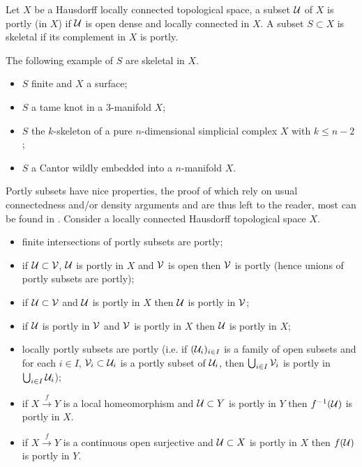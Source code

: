 \begin{defi} Let $X$ be a Hausdorff locally connected topological space, a subset $\mathcal{U}$ of $X$ is portly (in $X$) if $\mathcal{U}$ is open dense and locally connected in $X$. A subset $S\subset X$ is skeletal if its complement in $X$ is portly.
\end{defi}

\begin{ex} The following example of $S$ are skeletal in $X$.
\begin{itemize}
 \item $S$ finite  and $X$ a surface;
 \item $S$ a tame knot  in a $3$-manifold $X$;
 \item $S$ the $k$-skeleton of a pure $n$-dimensional simplicial complex $X$ with $k\leq n-2$;
 \item $S$ a Cantor wildly embedded into a $n$-manifold $X$.
\end{itemize} 
 \end{ex}





Portly subsets have nice properties, the proof of which rely on usual connectedness and/or density arguments and are thus left to the reader,
most can be found in \cite{MR0123298,MR1152367,MR2599123,thesis}. Consider a locally connected Hausdorff topological space $X$.
\begin{itemize}
 \item finite intersections of portly subsets are portly;
 \item if $\mathcal{U}\subset \mathcal V$, $\mathcal{U}$ is portly in $X$ and $\mathcal V$ is open then $\mathcal V$ is portly (hence unions of portly subsets are portly);
 \item if $\mathcal{U}\subset \mathcal V$ and $\mathcal{U}$ is portly in $X$ then $\mathcal{U}$ is portly in $\mathcal V$;
 \item if $\mathcal{U}$ is portly in $\mathcal V$ and $\mathcal V$ is portly in $X$ then $\mathcal{U}$ is portly in $X$;

 \item locally portly subsets are portly (i.e. if $(\mathcal{U}_i)_{i\in I}$ is a family of open subsets and for each $i\in I$, $\mathcal V_i\subset \mathcal{U}_i$ is a portly subset of $\mathcal{U}_i$, then $\bigcup_{i\in I}\mathcal V_i$ is portly in $\bigcup_{i\in I}\mathcal{U}_i$);
 \item if $X\xrightarrow{f} Y$ is a local homeomorphism and $\mathcal{U}\subset Y$ is portly in $Y$ then $f^{-1}(\mathcal{U})$ is portly in $X$.
 \item if $X\xrightarrow{f} Y$ is a continuous open surjective and $\mathcal{U}\subset X$ is portly in $X$ then $f(\mathcal{U})$ is portly in $Y
 $.
\end{itemize}




